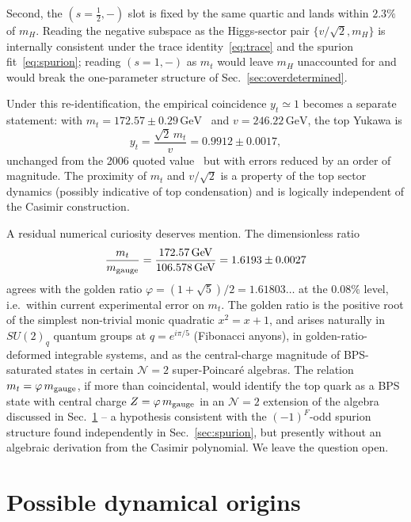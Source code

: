 \documentclass[twocolumn,aps,prd,floatfix,nofootinbib,superscriptaddress,10pt]{article}
\newcommand{\mH}{m_H}
\newcommand{\GeV}{\,\mathrm{GeV}}
\begin{document}
Second, the $(s=\tfrac12,-)$ slot is fixed by the same quartic and lands within $2.3\%$ of $\mH$. Reading the negative subspace as the Higgs-sector pair $\{v/\sqrt{2},\mH\}$ is internally consistent under the trace identity~\eqref{eq:trace} and the spurion fit~\eqref{eq:spurion}; reading $(s=1,-)$ as $m_t$ would leave $\mH$ unaccounted for and would break the one-parameter structure of Sec.~\ref{sec:overdetermined}.

Under this re-identification, the empirical coincidence $y_t\simeq 1$ becomes a separate statement: with $m_t=172.57\pm 0.29\GeV$~\cite{PDG2024} and $v=246.22\GeV$, the top Yukawa is
\begin{equation}
y_t = \frac{\sqrt{2}\,m_t}{v} = 0.9912\pm 0.0017,
\end{equation}
unchanged from the 2006 quoted value~\cite{TopMass2006} but with errors reduced by an order of magnitude. The proximity of $m_t$ and $v/\sqrt{2}$ is a property of the top sector dynamics (possibly indicative of top condensation) and is logically independent of the Casimir construction.

A residual numerical curiosity deserves mention. The dimensionless ratio
\begin{equation}
\frac{m_t}{m_{\rm gauge}} = \frac{172.57\GeV}{106.578\GeV} = 1.6193\pm 0.0027
\label{eq:phimass}
\end{equation}
agrees with the golden ratio $\varphi=(1+\sqrt5)/2=1.61803\ldots$ at the $0.08\%$ level, i.e.\ within current experimental error on $m_t$. The golden ratio is the positive root of the simplest non-trivial monic quadratic $x^2 = x+1$, and arises naturally in $SU(2)_q$ quantum groups at $q=e^{i\pi/5}$ (Fibonacci anyons), in golden-ratio-deformed integrable systems, and as the central-charge magnitude of BPS-saturated states in certain $\mathcal{N}=2$ super-Poincar\'e algebras. The relation $m_t = \varphi\,m_{\rm gauge}$, if more than coincidental, would identify the top quark as a BPS state with central charge $Z=\varphi\,m_{\rm gauge}$ in an $\mathcal{N}=2$ extension of the algebra discussed in Sec.~\ref{sec:origins} -- a hypothesis consistent with the $(-1)^F$-odd spurion structure found independently in Sec.~\ref{sec:spurion}, but presently without an algebraic derivation from the Casimir polynomial. We leave the question open.

\section{Possible dynamical origins}
\label{sec:origins}
\end{document}
